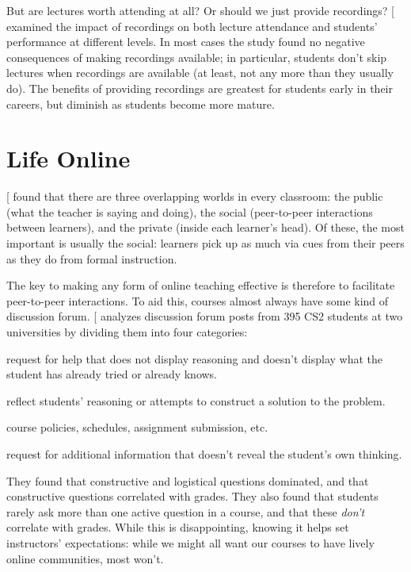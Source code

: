 But are lectures worth attending at all? Or should we just provide
recordings? {[}\protect[\hyperlink{b:Nord2017}{Nord2017}]{]} examined the impact of recordings on both
lecture attendance and students' performance at different levels. In
most cases the study found no negative consequences of making recordings
available; in particular, students don't skip lectures when recordings
are available (at least, not any more than they usually do). The
benefits of providing recordings are greatest for students early in
their careers, but diminish as students become more mature.

\section{Life Online}\label{s:online-engagement}

{[}\protect[\hyperlink{b:Nuth2007}{Nuth2007}]{]} found that there are three overlapping worlds in
every classroom: the public (what the teacher is saying and doing), the
social (peer-to-peer interactions between learners), and the private
(inside each learner's head). Of these, the most important is usually
the social: learners pick up as much via cues from their peers as they
do from formal instruction.

The key to making any form of online teaching effective is therefore to
facilitate peer-to-peer interactions. To aid this, courses almost always
have some kind of discussion forum. {[}\protect[\hyperlink{b:Vell2017}{Vell2017}]{]} analyzes
discussion forum posts from 395 CS2 students at two universities by
dividing them into four categories:

\begin{description}
\tightlist
\item[Active:]
request for help that does not display reasoning and doesn't display
what the student has already tried or already knows.
\item[Constructive:]
reflect students' reasoning or attempts to construct a solution to
the problem.
\item[Logistical:]
course policies, schedules, assignment submission, etc.
\item[Content clarification:]
request for additional information that doesn't reveal the student's
own thinking.
\end{description}

They found that constructive and logistical questions dominated, and
that constructive questions correlated with grades. They also found that
students rarely ask more than one active question in a course, and that
these \emph{don't} correlate with grades. While this is disappointing,
knowing it helps set instructors' expectations: while we might all want
our courses to have lively online communities, most won't.

